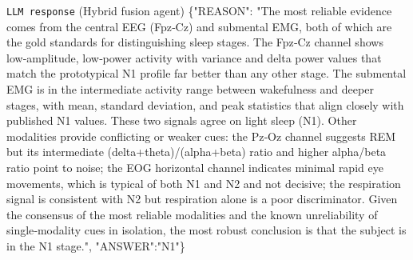 \begin{promptbox}{\texttt{LLM response} (Hybrid fusion agent)}
\{"REASON": "The most reliable evidence comes from the central EEG (Fpz‑Cz) and submental EMG, both of which are the gold standards for distinguishing sleep stages. The Fpz‑Cz channel shows low‑amplitude, low‑power activity with variance and delta power values that match the prototypical N1 profile far better than any other stage. The submental EMG is in the intermediate activity range between wakefulness and deeper stages, with mean, standard deviation, and peak statistics that align closely with published N1 values. These two signals agree on light sleep (N1). Other modalities provide conflicting or weaker cues: the Pz‑Oz channel suggests REM but its intermediate (delta+theta)/(alpha+beta) ratio and higher alpha/beta ratio point to noise; the EOG horizontal channel indicates minimal rapid eye movements, which is typical of both N1 and N2 and not decisive; the respiration signal is consistent with N2 but respiration alone is a poor discriminator. Given the consensus of the most reliable modalities and the known unreliability of single‑modality cues in isolation, the most robust conclusion is that the subject is in the N1 stage.", "ANSWER":"N1"\}
\end{promptbox}